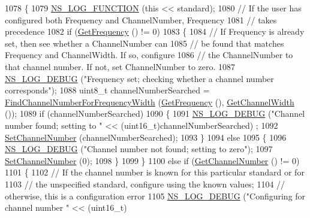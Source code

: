 \begin{DoxyCode}
1078 \{
1079   \hyperlink{log-macros-disabled_8h_a90b90d5bad1f39cb1b64923ea94c0761}{NS\_LOG\_FUNCTION} (\textcolor{keyword}{this} << standard);
1080   \textcolor{comment}{// If the user has configured both Frequency and ChannelNumber, Frequency}
1081   \textcolor{comment}{// takes precedence}
1082   \textcolor{keywordflow}{if} (\hyperlink{classns3_1_1WifiPhy_ad2508d94faf22d690d6b8b4367934fd1}{GetFrequency} () != 0)
1083     \{
1084       \textcolor{comment}{// If Frequency is already set, then see whether a ChannelNumber can}
1085       \textcolor{comment}{// be found that matches Frequency and ChannelWidth. If so, configure}
1086       \textcolor{comment}{// the ChannelNumber to that channel number. If not, set ChannelNumber to zero.}
1087       \hyperlink{group__logging_ga413f1886406d49f59a6a0a89b77b4d0a}{NS\_LOG\_DEBUG} (\textcolor{stringliteral}{"Frequency set; checking whether a channel number corresponds"});
1088       uint8\_t channelNumberSearched = \hyperlink{classns3_1_1WifiPhy_ac1a2644035e5ec7129ec1a1583face8a}{FindChannelNumberForFrequencyWidth} 
      (\hyperlink{classns3_1_1WifiPhy_ad2508d94faf22d690d6b8b4367934fd1}{GetFrequency} (), \hyperlink{classns3_1_1WifiPhy_a4a5d5009b3b3308f2baeed42a2007189}{GetChannelWidth} ());
1089       \textcolor{keywordflow}{if} (channelNumberSearched)
1090         \{
1091           \hyperlink{group__logging_ga413f1886406d49f59a6a0a89b77b4d0a}{NS\_LOG\_DEBUG} (\textcolor{stringliteral}{"Channel number found; setting to "} << (uint16\_t)channelNumberSearched)
      ;
1092           \hyperlink{classns3_1_1WifiPhy_a2d13cf6ae4c185cae8516516afe4a32a}{SetChannelNumber} (channelNumberSearched);
1093         \}
1094       \textcolor{keywordflow}{else}
1095         \{
1096           \hyperlink{group__logging_ga413f1886406d49f59a6a0a89b77b4d0a}{NS\_LOG\_DEBUG} (\textcolor{stringliteral}{"Channel number not found; setting to zero"});
1097           \hyperlink{classns3_1_1WifiPhy_a2d13cf6ae4c185cae8516516afe4a32a}{SetChannelNumber} (0);
1098         \}
1099     \}
1100   \textcolor{keywordflow}{else} \textcolor{keywordflow}{if} (\hyperlink{classns3_1_1WifiPhy_a5cf0ccf06109ace61db51c83e91b7e8d}{GetChannelNumber} () != 0)
1101     \{
1102       \textcolor{comment}{// If the channel number is known for this particular standard or for}
1103       \textcolor{comment}{// the unspecified standard, configure using the known values;}
1104       \textcolor{comment}{// otherwise, this is a configuration error}
1105       \hyperlink{group__logging_ga413f1886406d49f59a6a0a89b77b4d0a}{NS\_LOG\_DEBUG} (\textcolor{stringliteral}{"Configuring for channel number "} << (uint16\_t)

\end{DoxyCode}
